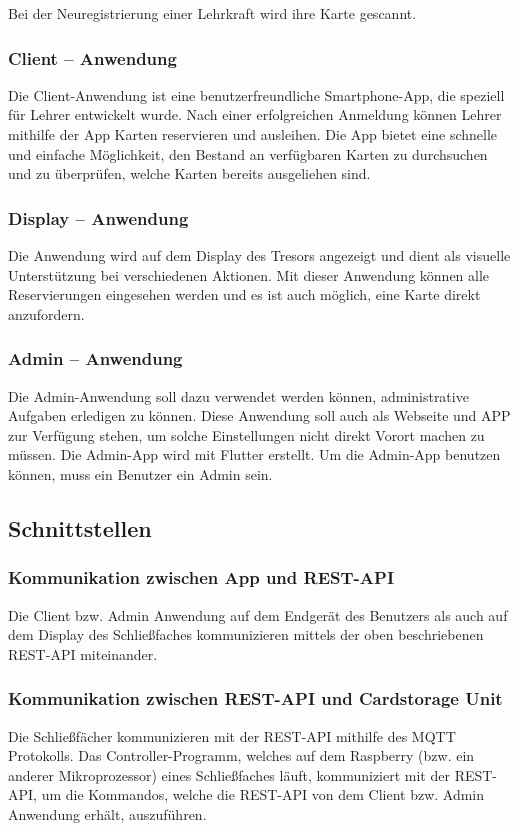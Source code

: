 Bei der Neuregistrierung einer Lehrkraft wird ihre Karte gescannt.
  
\subsubsection{Client – Anwendung}
Die Client-Anwendung ist eine benutzerfreundliche Smartphone-App, die speziell für Lehrer entwickelt wurde. Nach einer erfolgreichen Anmeldung können Lehrer mithilfe der App Karten reservieren und ausleihen. Die App bietet eine schnelle und einfache Möglichkeit, den Bestand an verfügbaren Karten zu durchsuchen und zu überprüfen, welche Karten bereits ausgeliehen sind.
  
\subsubsection{Display – Anwendung}
Die Anwendung wird auf dem Display des Tresors angezeigt und dient als visuelle Unterstützung bei verschiedenen Aktionen. Mit dieser Anwendung können alle Reservierungen eingesehen werden und es ist auch möglich, eine Karte direkt anzufordern.


\subsubsection{Admin – Anwendung}
Die Admin-Anwendung soll dazu verwendet werden können, administrative Aufgaben erledigen zu können. Diese Anwendung soll auch als Webseite und APP zur Verfügung stehen, um solche Einstellungen nicht direkt Vorort machen zu müssen. Die Admin-App wird mit Flutter erstellt. Um die Admin-App benutzen können, muss ein Benutzer ein Admin sein.


\subsection{Schnittstellen}
\subsubsection{Kommunikation zwischen App und REST-API}
Die Client bzw. Admin Anwendung auf dem Endgerät des Benutzers als auch auf dem Display des Schließfaches kommunizieren mittels der oben beschriebenen REST-API miteinander. 

\subsubsection{Kommunikation zwischen REST-API und Cardstorage Unit}
Die Schließfächer kommunizieren mit der REST-API mithilfe des MQTT Protokolls. Das Controller-Programm, welches auf dem Raspberry (bzw. ein anderer Mikroprozessor) eines Schließfaches läuft, kommuniziert mit der REST-API, um die Kommandos, welche die REST-API von dem Client bzw. Admin Anwendung erhält, auszuführen.

